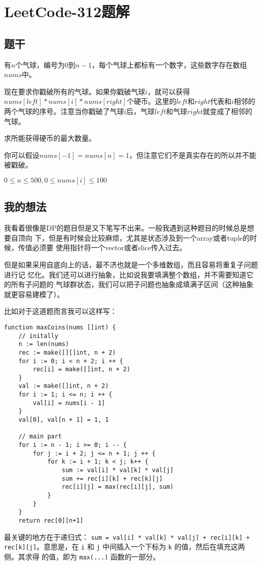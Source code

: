 
\section{LeetCode-312题解}

\subsection{题干}


有$n$个气球，编号为$0$到$n-1$，每个气球上都标有一个数字，这些数字存在数组$nums$中。

现在要求你戳破所有的气球。如果你戳破气球$i$，就可以获得$nums[left]*nums[i]*nums[right]$个硬币。这里的$left$和$right$代表和$i$相邻的两个气球的序号。注意当你戳破了气球$i$后，气球$left$和气球$right$就变成了相邻的气球。

求所能获得硬币的最大数量。


你可以假设$nums[-1]=nums[n]=1$，但注意它们不是真实存在的所以并不能被戳破。

$0\le n\le 500, 0\le nums[i]\le 100$

\subsection{我的想法}

我看着很像是DP的题目但是又下笔写不出来。一般我遇到这种题目的时候总是想要自顶向
下，但是有时候会比较麻烦，尤其是状态涉及到一个array或者tuple的时候，传值必须要
使用指针将一个vector或者slice传入过去。

但是如果采用自底向上的话，最不济也就是一个多维数组，而且容易将重复子问题进行记
忆化。我们还可以进行抽象，比如说我要填满整个数组，并不需要知道它的所有子问题的
气球群状态，我们可以把子问题也抽象成填满子区间（这种抽象就更容易建模了）。

比如对于这道题而言我可以这样写：
\begin{lstlisting}
function maxCoins(nums []int) {
    // initally
    n := len(nums)
    rec := make([][]int, n + 2)
    for i := 0; i < n + 2; i ++ {
        rec[i] = make([]int, n + 2)
    }
    val := make([]int, n + 2)
    for i := 1; i <= n; i ++ {
        val[i] = nums[i - 1]
    }
    val[0], val[n + 1] = 1, 1

    // main part
    for i := n - 1; i >= 0; i -- {
        for j := i + 2; j <= n + 1; j ++ {
            for k := i + 1; k < j; k++ {
                sum := val[i] * val[k] * val[j]
                sum += rec[i][k] + rec[k][j]
                rec[i][j] = max(rec[i][j], sum)
            }
        }
    }
    return rec[0][n+1]
\end{lstlisting}

最关键的地方在于递归式：%
\verb|sum = val[i] * val[k] * val[j] + rec[i][k] + rec[k][j]|。意思是，在
\verb|i| 和 \verb|j| 中间插入一个下标为 \verb|k| 的值，然后在填充这两侧。其求得
的值，即为 \verb|max(...)| 函数的一部分。



